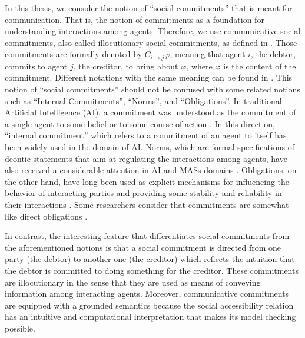 In this thesis, we consider the notion of ``social commitments'' that is meant for communication. That is, the notion of commitments as a foundation for understanding interactions among agents. Therefore, we use communicative social commitments, also called illocutionary social commitments, as defined in \cite{Bentahar2012,El-Menshawy2013a}. Those commitments are formally denoted by $C_{i \to j} \varphi$, meaning that agent $i$, the debtor, commits to agent $j$, the creditor, to bring about $\varphi$, where $\varphi$ is the content of the commitment. Different notations with the same meaning can be found in \cite{Desai2009,Fornara2004a,Singh2000}.
This notion of ``social commitments'' should not be confused with some related notions such as ``Internal Commitments'', ``Norms'', and ``Obligations''. In traditional Artificial Intelligence (AI), a commitment was understood as the commitment of a single agent to some belief or to some course of action \cite{Levesque1990}. In this direction, ``internal commitment'' \cite{Castelfranchi1995,Singh2008} which refers to a commitment of an agent to itself has been widely used in the domain of AI. Norms, which are formal specifications of deontic statements that aim at regulating the interactions among agents, have also received a considerable attention in AI and MASs domains \cite{Balke2013,Singh2013,Testerink2013}. Obligations, on the other hand, have long been used as explicit mechanisms for influencing the behavior of interacting parties and providing some stability and reliability in their interactions \cite{Dignum2002}. Some researchers consider that commitments are somewhat like direct obligations \cite{Dignum1996,Singh2008}.

In contrast, the interesting feature that differentiates social commitments from the aforementioned notions is that a social commitment is directed from one party (the debtor) to another one (the creditor) which reflects the intuition that the debtor is committed to doing something for the creditor. These commitments are illocutionary in the sense that they are used as means of conveying information among interacting agents. Moreover, communicative commitments are equipped with a grounded semantics because the social accessibility relation has an intuitive and computational interpretation that makes its model checking possible.







